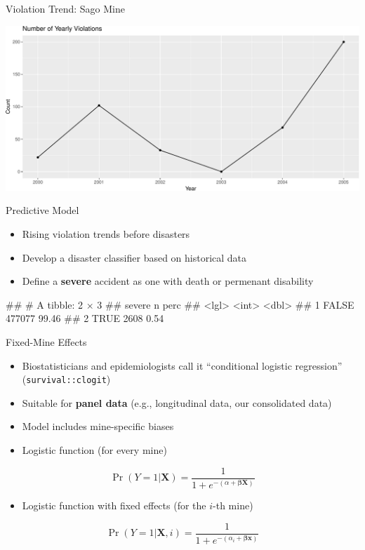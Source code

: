 \documentclass[
]{beamer}
\providecommand{\tightlist}{%
  \setlength{\itemsep}{0pt}\setlength{\parskip}{0pt}}
\let\oldverbatim\verbatim
\let\endoldverbatim\endverbatim
\renewenvironment{verbatim}{\footnotesize\oldverbatim}{\endoldverbatim}
\begin{document}
\begin{frame}{Violation Trend: Sago Mine}

\begin{center}\includegraphics{presentation_slides_files/figure-beamer/sago-1} \end{center}

\end{frame}

\begin{frame}[fragile]{Predictive Model}

\begin{itemize}
\tightlist
\item
  Rising violation trends before disasters
\item
  Develop a disaster classifier based on historical data
\item
  Define a \textbf{severe} accident as one with death or permenant
  disability 
\end{itemize}

\begin{verbatim}
## # A tibble: 2 × 3
##   severe      n  perc
##    <lgl>  <int> <dbl>
## 1  FALSE 477077 99.46
## 2   TRUE   2608  0.54
\end{verbatim}

\end{frame}

\begin{frame}[fragile]{Fixed-Mine Effects}

\begin{itemize}
\tightlist
\item
  Biostatisticians and epidemiologists call it ``conditional logistic
  regression'' (\texttt{survival::clogit})
\item
  Suitable for \textbf{panel data} (e.g., longitudinal data, our
  consolidated data)
\item
  Model includes mine-specific biases
\item
  Logistic function (for every mine)
\end{itemize}

\[\Pr(Y=1|\mathbf{X}) = \frac{1}{1+e^{-(\alpha+\boldsymbol\beta\mathbf{X})}}\]

\begin{itemize}
\tightlist
\item
  Logistic function with fixed effects (for the \(i\)-th mine)
\end{itemize}

\[\Pr(Y=1|\mathbf{X},i) = \frac{1}{1+e^{-(\alpha_i+\boldsymbol\beta\mathbf{x})}}\]

\end{frame}
\end{document}
